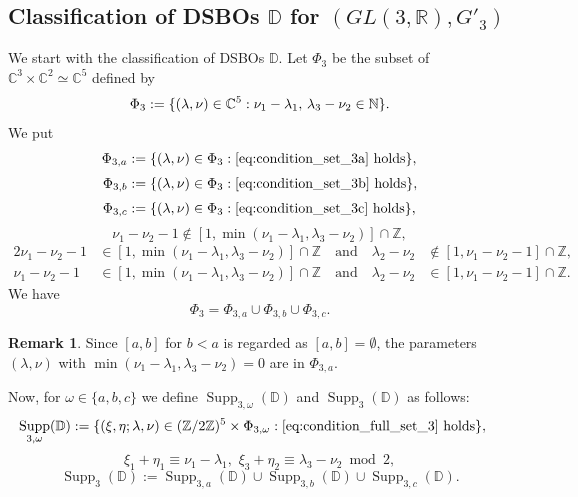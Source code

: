 \documentclass[a4paper,11pt,reqno]{amsart}
\newcommand{\DD}{\mathbb{D}}
\newcommand{\0}{{\bf 0}}
\newcommand{\N}{\mathbb{N}}
\newcommand{\Z}{\mathbb{Z}}
\newcommand{\R}{\mathbb{R}}
\newcommand{\C}{\mathbb{C}}
\newcommand{\1}{{\bf 1}}
\DeclareMathOperator{\Supp}{Supp}
\theoremstyle{plain}
\theoremstyle{definition}
\newtheorem{remark}[equation]{Remark}
\numberwithin{equation}{section}
\theoremstyle{definition}
\begin{document}
\subsection{Classification of DSBOs \texorpdfstring{$\DD$}{ } for \texorpdfstring{$(GL(3,\R), G'_3)$}{(GL(3,R),G₃')}}
\label{sec:ClassThmsDSBOs}

We start with the classification of DSBOs $\DD$.
Let $\Phi_{3}$ be the subset of $\C^3\times \C^2 \simeq \C^5$ defined by
\begin{equation}\label{eqn:Phi3}
\Phi_{3} := \{(\lambda, \nu) \in \C^5: \nu_1-\lambda_1,\, \lambda_3-\nu_2 \in \N\}.\\
\end{equation}
We put
\begin{align*}
    \Phi_{3,a} &:= \{(\lambda, \nu) \in \Phi_3: \eqref{eq:condition_set_3a} \text{ holds}\},\\[3pt]
    \Phi_{3,b} &:= \{(\lambda, \nu) \in \Phi_3: \eqref{eq:condition_set_3b} \text{ holds}\},\\[3pt]
    \Phi_{3,c} &:= \{(\lambda, \nu) \in \Phi_3: \eqref{eq:condition_set_3c} \text{ holds}\},
\end{align*}
\begin{equation}\label{eq:condition_set_3a}
    \nu_1-\nu_2-1 \notin [1, \min(\nu_1-\lambda_1, \lambda_3-\nu_2)]\cap \Z,
\end{equation}
\begin{alignat}{2}
    \nu_1-\nu_2-1 &\in  [1, \min(\nu_1-\lambda_1, \lambda_3-\nu_2)]\cap \Z
     \quad \text{and} \quad
     \lambda_2 -\nu_2 &\notin [1, \nu_1-\nu_2-1]\cap \Z, 
     \label{eq:condition_set_3b}\\[3pt]
    \nu_1-\nu_2-1 &\in  [1, \min(\nu_1-\lambda_1, \lambda_3-\nu_2)]\cap \Z
     \quad \text{and} \quad
     \lambda_2 -\nu_2 &\in [1, \nu_1-\nu_2-1]\cap \Z.
          \label{eq:condition_set_3c}
\end{alignat}
We have 
\begin{equation*}
\Phi_{3} = \Phi_{3,a}\cup\Phi_{3,b}\cup\Phi_{3,c}.
\end{equation*}

\begin{remark}
Since $[a,b]$ for $b < a$ is regarded as $[a,b]=\emptyset$, 
the parameters 
$(\lambda,\nu)$ with $\min(\nu_1-\lambda_1,\lambda_3-\nu_2) =0$ are in $\Phi_{3,a}$. 
\end{remark}

Now, for $\omega \in \{a, b, c\}$ we define 
$\Supp_{3,\omega}(\DD)$ and $\Supp_3(\DD)$ 
as follows:
\begin{align*}
\Supp_{3,\omega}(\DD)&:= \{(\xi, \eta; \lambda, \nu) \in (\Z/2\Z)^5 \times \Phi_{3,\omega}: \eqref{eq:condition_full_set_3} \text{ holds}\},
\end{align*}
\begin{equation}
\label{eq:condition_full_set_3}
\xi_1+\eta_1 \equiv \nu_1-\lambda_1,\,\,  \xi_3+\eta_2 \equiv \lambda_3-\nu_2 \bmod{2},
\end{equation}
\begin{equation*}
    \Supp_3(\DD) := \Supp_{3,a}(\DD)\cup \Supp_{3,b}(\DD)\cup \Supp_{3,c}(\DD).
\end{equation*}
\end{document}
